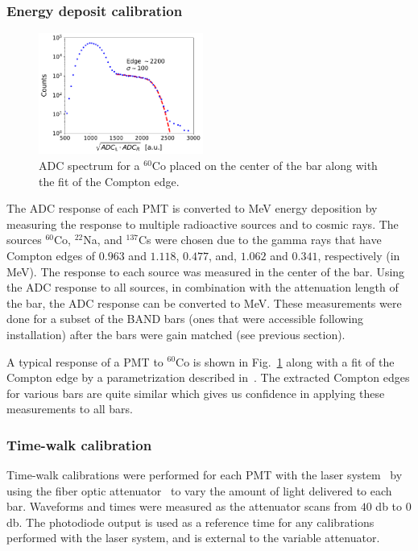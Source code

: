\documentclass[3p,final,twocolumn]{elsarticle}
\begin{document}
\subsubsection{Energy deposit calibration}
\label{sec:energydeposit}
\begin{figure}[tbh]
	\centering
		\includegraphics[width=0.48\textwidth]{cobaltfit.pdf}
		\caption{ADC spectrum for a $^{60}$Co placed on the center of the bar along with the fit of the Compton edge.}
	\label{fig:compton_edge}
\end{figure}


The ADC response of each PMT is converted to \si{\mega\electronvolt}
energy deposition by measuring the response to multiple radioactive
sources and to cosmic rays. The sources $^{60}$Co, $^{22}$Na, and $^{137}$Cs were chosen due
to the gamma rays that have Compton edges of $0.963$ and $1.118$,
$0.477$, and, $1.062$ and $0.341$, respectively (in
\si{\mega\electronvolt}). The response to each source was measured in
the center of the bar. Using the ADC response to all sources, in
combination with the attenuation length of the bar, the ADC response
can be converted to \si{\mega\electronvolt}. These measurements were
done for a subset of the BAND bars (ones that were accessible following
installation) after the bars were gain matched (see previous section).

A typical response of a PMT to $^{60}$Co is shown in
Fig.~\ref{fig:compton_edge} along with a fit of the Compton edge by a
parametrization described in~\cite{comptonedge}. The extracted Compton edges
for various bars are quite similar which gives us confidence in
applying these measurements to all bars. 

\subsubsection{Time-walk calibration}
Time-walk calibrations were performed for each PMT with the laser system~\cite{band-laser} by using the fiber optic attenuator~\cite{attenuator} to vary
the amount of light delivered to each bar. Waveforms and times were measured as the attenuator scans from $40$ \si{\decibel} to $0$ 
\si{\decibel}. The photodiode output is used as a reference time for any calibrations 
performed with the laser system, and is external to the variable attenuator.
\end{document}
